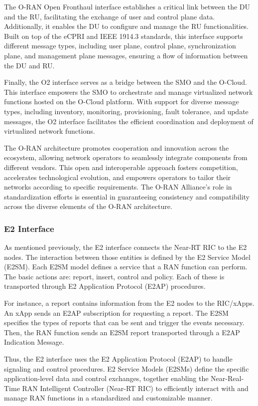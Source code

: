 The O-RAN Open Fronthaul interface establishes a critical link between the DU and the RU, facilitating the exchange of user and control plane data. Additionally, it enables the DU to configure and manage the RU functionalities. Built on top of the eCPRI and IEEE 1914.3 standards, this interface supports different message types, including user plane, control plane, synchronization plane, and management plane messages, ensuring a flow of information between the DU and RU.

Finally, the O2 interface serves as a bridge between the SMO and the O-Cloud. This interface empowers the SMO to orchestrate and manage virtualized network functions hosted on the O-Cloud platform. With support for diverse message types, including inventory, monitoring, provisioning, fault tolerance, and update messages, the O2 interface facilitates the efficient coordination and deployment of virtualized network functions.

The O-RAN architecture promotes cooperation and innovation across the ecosystem, allowing network operators to seamlessly integrate components from different vendors. This open and interoperable approach fosters competition, accelerates technological evolution, and empowers operators to tailor their networks according to specific requirements. The O-RAN Alliance's role in standardization efforts is essential in guaranteeing consistency and compatibility across the diverse elements of the O-RAN architecture.


\subsubsection{E2 Interface}\label{sec:protocols}
As mentioned previously, the E2 interface connects the Near-RT RIC to the E2 nodes.
The interaction between those entities is defined by the E2 Service Model (E2SM).
Each E2SM model defines a service that a RAN function can perform.
The basic actions are: report, insert, control and policy.
Each of these is transported through E2 Application Protocol (E2AP) procedures.

For instance, a report contains information from the E2 nodes to the RIC/xApps.
An xApp sends an E2AP subscription for requesting a report.
The E2SM specifies the types of reports that can be sent and trigger the events necessary.
Then, the RAN function sends an E2SM report transported through a E2AP Indication Message.

Thus, the E2 interface uses the E2 Application Protocol (E2AP) to handle signaling and control procedures.
E2 Service Models (E2SMs) define the specific application-level data and control exchanges, together enabling the Near-Real-Time RAN Intelligent Controller (Near-RT RIC) to efficiently interact with and manage RAN functions in a standardized and customizable manner.

